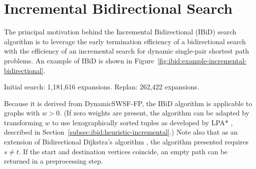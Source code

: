\section{Incremental Bidirectional Search}
\label{sef:ibid:ibid}

The principal motivation behind
the Incremental Bidirectional (IBiD) search algorithm
is to leverage the early termination efficiency of a bidirectional search
with the efficiency of an incremental search for dynamic
single-pair shortest path problems.
An example of IBiD is shown in
Figure~\ref{fig:ibid:example-incremental-bidirectional}.
\begin{marginfigure}%
   \centering%
   
   \caption{Initial search: 1,181,616 expansions.
      Replan: 262,422 expansions.}%
   \label{fig:ibid:example-incremental-bidirectional}%
\end{marginfigure}

Because it is derived from DynamicSWSF-FP,
the IBiD algorithm is applicable to graphs with $w > 0$.
(If zero weights are present,
the algorithm can be adapted by transforming $w$ to use
lexographically sorted tuples as developed
by LPA* \citep{koenig2004lpastar},
described in Section~\ref{subsec:ibid:heuristic-incremental}.)
Note also that as an extension of
Bidirectional Dijkstra's algorithm \citep{goldberg2005spexternalmemory},
the algorithm presented requires $s \neq t$.
If the start and destination vertices coincide,
an empty path can be returned in a preprocessing step.

